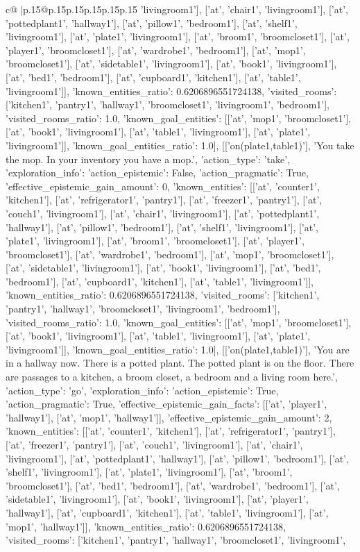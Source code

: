 \documentclass{article}
\begin{document}
{\begin{supertabular}{c@{$\;$}|p{.15\linewidth}@{}p{.15\linewidth}p{.15\linewidth}p{.15\linewidth}p{.15\linewidth}p{.15\linewidth}}
{{{'livingroom1'], ['at', 'chair1', 'livingroom1'], ['at', 'pottedplant1', 'hallway1'], ['at', 'pillow1', 'bedroom1'], ['at', 'shelf1', 'livingroom1'], ['at', 'plate1', 'livingroom1'], ['at', 'broom1', 'broomcloset1'], ['at', 'player1', 'broomcloset1'], ['at', 'wardrobe1', 'bedroom1'], ['at', 'mop1', 'broomcloset1'], ['at', 'sidetable1', 'livingroom1'], ['at', 'book1', 'livingroom1'], ['at', 'bed1', 'bedroom1'], ['at', 'cupboard1', 'kitchen1'], ['at', 'table1', 'livingroom1']], 'known_entities_ratio': 0.6206896551724138, 'visited_rooms': ['kitchen1', 'pantry1', 'hallway1', 'broomcloset1', 'livingroom1', 'bedroom1'], 'visited_rooms_ratio': 1.0, 'known_goal_entities': [['at', 'mop1', 'broomcloset1'], ['at', 'book1', 'livingroom1'], ['at', 'table1', 'livingroom1'], ['at', 'plate1', 'livingroom1']], 'known_goal_entities_ratio': 1.0}}], [['on(plate1,table1)'], 'You take the mop. In your inventory you have a mop.', {'action_type': 'take', 'exploration_info': {'action_epistemic': False, 'action_pragmatic': True, 'effective_epistemic_gain_amount': 0, 'known_entities': [['at', 'counter1', 'kitchen1'], ['at', 'refrigerator1', 'pantry1'], ['at', 'freezer1', 'pantry1'], ['at', 'couch1', 'livingroom1'], ['at', 'chair1', 'livingroom1'], ['at', 'pottedplant1', 'hallway1'], ['at', 'pillow1', 'bedroom1'], ['at', 'shelf1', 'livingroom1'], ['at', 'plate1', 'livingroom1'], ['at', 'broom1', 'broomcloset1'], ['at', 'player1', 'broomcloset1'], ['at', 'wardrobe1', 'bedroom1'], ['at', 'mop1', 'broomcloset1'], ['at', 'sidetable1', 'livingroom1'], ['at', 'book1', 'livingroom1'], ['at', 'bed1', 'bedroom1'], ['at', 'cupboard1', 'kitchen1'], ['at', 'table1', 'livingroom1']], 'known_entities_ratio': 0.6206896551724138, 'visited_rooms': ['kitchen1', 'pantry1', 'hallway1', 'broomcloset1', 'livingroom1', 'bedroom1'], 'visited_rooms_ratio': 1.0, 'known_goal_entities': [['at', 'mop1', 'broomcloset1'], ['at', 'book1', 'livingroom1'], ['at', 'table1', 'livingroom1'], ['at', 'plate1', 'livingroom1']], 'known_goal_entities_ratio': 1.0}}], [['on(plate1,table1)'], 'You are in a hallway now. There is a potted plant. The potted plant is on the floor. There are passages to a kitchen, a broom closet, a bedroom and a living room here.', {'action_type': 'go', 'exploration_info': {'action_epistemic': True, 'action_pragmatic': True, 'effective_epistemic_gain_facts': [['at', 'player1', 'hallway1'], ['at', 'mop1', 'hallway1']], 'effective_epistemic_gain_amount': 2, 'known_entities': [['at', 'counter1', 'kitchen1'], ['at', 'refrigerator1', 'pantry1'], ['at', 'freezer1', 'pantry1'], ['at', 'couch1', 'livingroom1'], ['at', 'chair1', 'livingroom1'], ['at', 'pottedplant1', 'hallway1'], ['at', 'pillow1', 'bedroom1'], ['at', 'shelf1', 'livingroom1'], ['at', 'plate1', 'livingroom1'], ['at', 'broom1', 'broomcloset1'], ['at', 'bed1', 'bedroom1'], ['at', 'wardrobe1', 'bedroom1'], ['at', 'sidetable1', 'livingroom1'], ['at', 'book1', 'livingroom1'], ['at', 'player1', 'hallway1'], ['at', 'cupboard1', 'kitchen1'], ['at', 'table1', 'livingroom1'], ['at', 'mop1', 'hallway1']], 'known_entities_ratio': 0.6206896551724138, 'visited_rooms': ['kitchen1', 'pantry1', 'hallway1', 'broomcloset1', 'livingroom1', }}}
\end{supertabular}}
\end{document}

